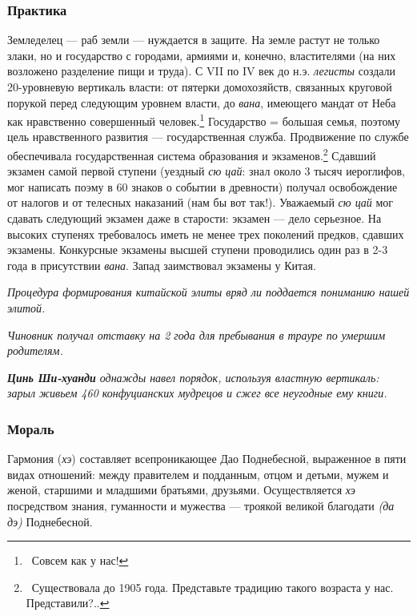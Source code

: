 \documentclass[twoside,a4paper]{article}
\begin{document}
\subsubsection{Практика}
{
Земледелец — раб земли — нуждается в защите. На земле растут не только злаки, но и государство с городами, армиями и,
конечно, властителями (на них возложено разделение пищи и труда). С \foreignlanguage{english}{VII} по
\foreignlanguage{english}{IV} век до н.э. \textit{легисты} создали 20-уровневую вертикаль власти: от пятерки
домохозяйств, связанных круговой порукой перед следующим уровнем власти, до \textit{вана}, имеющего мандат от Неба как
нравственно совершенный человек.\footnote{\foreignlanguage{russian}{\ Совсем как у нас!}} Государство = большая семья,
поэтому цель нравственного развития — государственная служба. Продвижение по службе обеспечивала государственная
система образования и экзаменов.\footnote{\foreignlanguage{russian}{\ Существовала до 1905 года. Представьте традицию
такого возраста у нас. Представили?..}} Сдавший экзамен самой первой ступени (уездный \textit{сю цай}: знал около 3
тысяч иероглифов, мог написать поэму в 60 знаков о событии в древности) получал освобождение от налогов и от телесных
наказаний (нам бы вот так!). Уважаемый \textit{сю цай} мог сдавать следующий экзамен даже в старости: экзамен — дело
серьезное. На высоких ступенях требовалось иметь не менее трех поколений предков, сдавших экзамены. Конкурсные экзамены
высшей ступени проводились один раз в 2-3 года в присутствии \textit{вана}. Запад заимствовал экзамены у Китая.}

{\itshape
Процедура формирования китайской элиты вряд ли поддается пониманию нашей элитой.}

{\itshape
Чиновник получал отставку на 2 года для пребывания в трауре по умершим родителям.}

{\itshape
\textbf{Цинь Ши-хуанди }однажды\textbf{ }навел порядок, используя властную вертикаль: зарыл живьем 460 конфуцианских
мудрецов и сжег все неугодные ему книги.}

\subsubsection{Мораль}
{
{\textquotedbl}Гармония{\textquotedbl} (\textit{хэ}) составляет всепроникающее Дао Поднебесной, выраженное в пяти видах
отношений: между правителем и подданным, отцом и детьми, мужем и женой, старшими и младшими братьями, друзьями\textit{.
}Осуществляется \textit{хэ} посредством {\textquotedbl}знания{\textquotedbl}, {\textquotedbl}гуманности{\textquotedbl}
и {\textquotedbl}мужества{\textquotedbl} — троякой {\textquotedbl}великой благодати{\textquotedbl} \textit{(да дэ)
}Поднебесной. }
\end{document}
